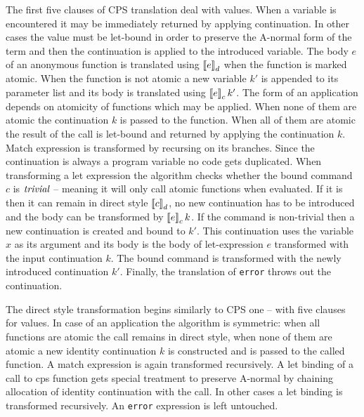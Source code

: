 The first five clauses of CPS translation deal with values.
When a variable is encountered it may be immediately returned by applying continuation.
In other cases the value must be let-bound in order to preserve the A-normal form of the term and then the continuation is applied to the introduced variable.
The body $e$ of an anonymous function is translated using $\left\llbracket e \right\rrbracket_d$ when the function is marked atomic.
When the function is not atomic a new variable $k'$ is appended to its parameter list and its body is translated using $\left\llbracket e \right\rrbracket_c k'$.
The form of an application depends on atomicity of functions which may be applied.
When none of them are atomic the continuation $k$ is passed to the function.
When all of them are atomic the result of the call is let-bound and returned by applying the continuation $k$.
Match expression is transformed by recursing on its branches.
Since the continuation is always a program variable no code gets duplicated.
When transforming a let expression the algorithm checks whether the bound command $c$ is $\mathit{trivial}$ -- meaning it will only call atomic functions when evaluated.
If it is then it can remain in direct style $\left\llbracket c \right\rrbracket_d$, no new continuation has to be introduced and the body can be transformed by $\left\llbracket e \right\rrbracket_c k$.
If the command is non-trivial then a new continuation is created and bound to $k'$.
This continuation uses the variable $x$ as its argument and its body is the body of let-expression $e$ transformed with the input continuation $k$.
The bound command is transformed with the newly introduced continuation $k'$.
Finally, the translation of \lstinline!error! throws out the continuation.

The direct style transformation begins similarly to CPS one -- with five clauses for values.
In case of an application the algorithm is symmetric: when all functions are atomic the call remains in direct style, when none of them are atomic a new identity continuation $k$ is constructed and is passed to the called function.
A match expression is again transformed recursively.
A let binding of a call to cps function gets special treatment to preserve A-normal by chaining allocation of identity continuation with the call.
In other cases a let binding is transformed recursively.
An \lstinline!error! expression is left untouched.

